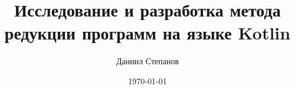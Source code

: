 
\title{Исследование и разработка метода редукции программ на языке Kotlin}
\author{Даниил Степанов}
\date{\today}



\begin{frame}
\titlepage
\end{frame} 

%  
